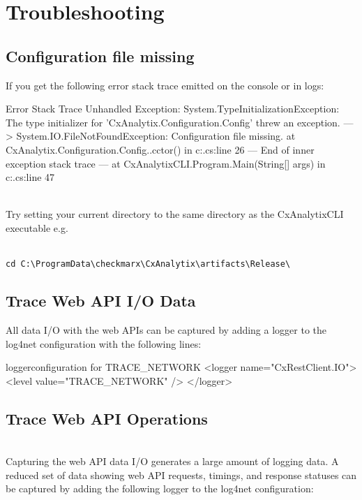 \chapter{Troubleshooting}

\section{Configuration file missing}
If you get the following error stack trace emitted on the console or in logs:

\begin{code}{Error Stack Trace}{}{}
Unhandled Exception: System.TypeInitializationException: The type initializer for 
'CxAnalytix.Configuration.Config' threw an exception. 
    ---> System.IO.FileNotFoundException: Configuration file missing.
   at CxAnalytix.Configuration.Config..cctor() in 
   c:\programdata\checkmarx\CxAnalytix\Configuration\Config.cs:line 26
   --- End of inner exception stack trace ---
   at CxAnalytixCLI.Program.Main(String[] args) in 
   c:\programdata\checkmarx\CxAnalytix\CxAnalytixCLI\Program.cs:line 47
\end{code}

\noindent\\Try setting your current directory to the same directory as the CxAnalytixCLI executable e.g.

\noindent\\\texttt{cd C:\textbackslash ProgramData\textbackslash checkmarx\textbackslash CxAnalytix\textbackslash artifacts\textbackslash Release\textbackslash}


\section{Trace Web API I/O Data}

All data I/O with the web APIs can be captured by adding a logger to the log4net configuration with the following lines:

\begin{xml}{logger}{configuration for TRACE\_NETWORK}{}
<logger name="CxRestClient.IO">
    <level value="TRACE_NETWORK" />
</logger>
\end{xml}

\section{Trace Web API Operations}

\noindent\\Capturing the web API data I/O generates a large amount of logging data.  A reduced set of data showing web API requests, timings, and 
response statuses can be captured by adding the following logger to the log4net configuration:

